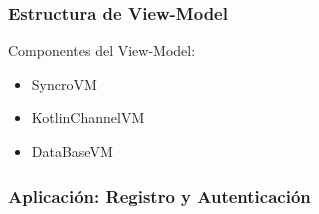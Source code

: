 \documentclass[14pt]{beamer}
\begin{document}
\begin{frame}
\frametitle{Estructura de View-Model}
Componentes del View-Model:
\begin{itemize}
\item SyncroVM
\item KotlinChannelVM
\item DataBaseVM


\end{itemize}


\end{frame}


\begin{frame}
\frametitle{Aplicación: Registro y Autenticación}
\begin{columns}
\begin{column}{0.25\textwidth}
\begin{center}


\end{center}
\end{column}
\end{columns}
\end{frame}
\end{document}
